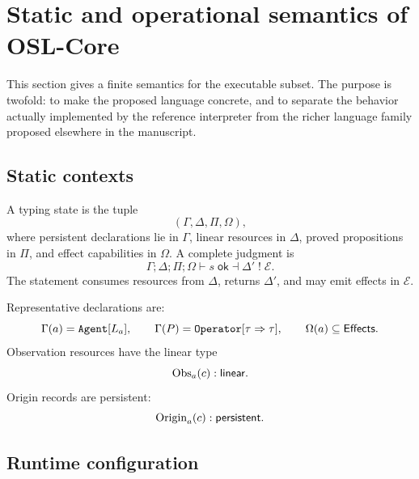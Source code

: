 \section{Static and operational semantics of OSL-Core}
\label{sec:osl-semantics}

This section gives a finite semantics for the executable subset.  The purpose is
twofold: to make the proposed language concrete, and to separate the behavior
actually implemented by the reference interpreter from the richer language
family proposed elsewhere in the manuscript.

\subsection{Static contexts}

A typing state is the tuple
\[
(\Gamma,\Delta,\Pi,\Omega),
\]
where persistent declarations lie in \(\Gamma\), linear resources in
\(\Delta\), proved propositions in \(\Pi\), and effect capabilities in
\(\Omega\).  A complete judgment is
\[
\Gamma;\Delta;\Pi;\Omega
\vdash s\;\mathsf{ok}
\dashv\Delta'
\;!\;\mathcal E.
\]
The statement consumes resources from \(\Delta\), returns \(\Delta'\), and may
emit effects in \(\mathcal E\).

Representative declarations are:
\[
\Gamma(a)=\texttt{Agent}[L_a],
\qquad
\Gamma(P)=\texttt{Operator}[\tau\Rightarrow\tau],
\qquad
\Omega(a)\subseteq\mathsf{Effects}.
\]
Observation resources have the linear type
\[
\operatorname{Obs}_a(c):\mathsf{linear}.
\]
Origin records are persistent:
\[
\operatorname{Origin}_a(c):\mathsf{persistent}.
\]

\subsection{Runtime configuration}

